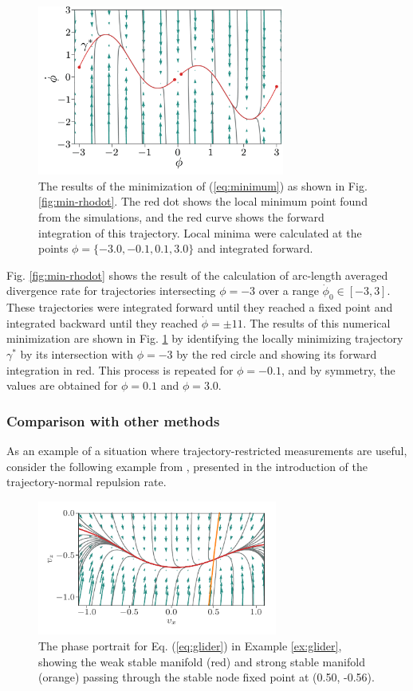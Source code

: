 \documentclass[twocolumn]{svjour3}
\newcommand{\edit}[3]{{\color{red} #2}}
\begin{document}
\begin{figure}
	\centering
	\includegraphics[width=3.2in]{Fig11}
	\caption{The results of the minimization of (\ref{eq:minimum}) as shown in Fig. \ref{fig:min-rhodot}. The red dot shows the \edit{}{local}{20} minimum point found from the simulations, and the red curve shows the forward integration of this trajectory. Local minima were calculated at the points $\phi=\{-3.0, -0.1, 0.1, 3.0\}$ and integrated forward.}
	\label{fig:min-rhodot-comp}
\end{figure}

Fig. \ref{fig:min-rhodot} shows the result of the calculation of arc-length averaged divergence rate for trajectories intersecting $\phi=-3$ over a range $\dot{\phi}_0\in[-3, 3]$. These trajectories were integrated forward until they reached a fixed point and integrated backward until they reached $\dot{\phi}=\pm11$. The results of this numerical minimization are shown in Fig. \ref{fig:min-rhodot-comp} by identifying the \edit{}{locally}{20} minimizing trajectory $\gamma^*$ by its intersection with $\phi=-3$ by the red circle and showing its forward integration in red. This process is repeated for $\phi=-0.1$, and by symmetry, the values are obtained for $\phi=0.1$ and $\phi=3.0$.

\subsubsection{Comparison with other methods}
As an example of a situation where trajectory-restricted measurements are useful, consider the following example from \cite{haller_variational_2011}, presented in the introduction of the trajectory-normal repulsion rate.

\begin{figure}
\centering
\includegraphics[width=3.1in]{Fig12}
\caption{The phase portrait for Eq. (\ref{eq:glider}) in Example \ref{ex:glider}, showing the weak stable manifold \edit{passing through the origin}{(red) and strong stable manifold (orange) passing through the stable node fixed point at (0.50, -0.56).}{22}}
\label{fig:glider}
\end{figure}
\end{document}
